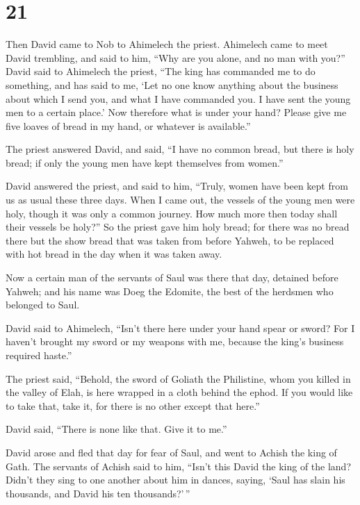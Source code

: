 \hypertarget{section-20}{%
\section{21}\label{section-20}}

 Then David came to Nob to Ahimelech the priest. Ahimelech
came to meet David trembling, and said to him, ``Why are you alone, and
no man with you?''  David said to Ahimelech the priest,
``The king has commanded me to do something, and has said to me, `Let no
one know anything about the business about which I send you, and what I
have commanded you. I have sent the young men to a certain place.'
 Now therefore what is under your hand? Please give me
five loaves of bread in my hand, or whatever is available.''

 The priest answered David, and said, ``I have no common
bread, but there is holy bread; if only the young men have kept
themselves from women.''

 David answered the priest, and said to him, ``Truly,
women have been kept from us as usual these three days. When I came out,
the vessels of the young men were holy, though it was only a common
journey. How much more then today shall their vessels be holy?''
 So the priest gave him holy bread; for there was no bread
there but the show bread that was taken from before Yahweh, to be
replaced with hot bread in the day when it was taken away.

 Now a certain man of the servants of Saul was there that
day, detained before Yahweh; and his name was Doeg the Edomite, the best
of the herdsmen who belonged to Saul.

 David said to Ahimelech, ``Isn't there here under your
hand spear or sword? For I haven't brought my sword or my weapons with
me, because the king's business required haste.''

 The priest said, ``Behold, the sword of Goliath the
Philistine, whom you killed in the valley of Elah, is here wrapped in a
cloth behind the ephod. If you would like to take that, take it, for
there is no other except that here.''

David said, ``There is none like that. Give it to me.''

 David arose and fled that day for fear of Saul, and went
to Achish the king of Gath.  The servants of Achish said
to him, ``Isn't this David the king of the land? Didn't they sing to one
another about him in dances, saying, `Saul has slain his thousands, and
David his ten thousands?'\,''

